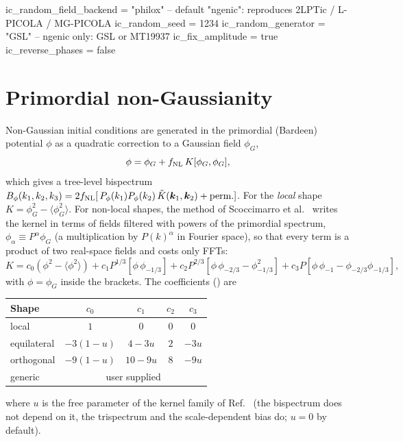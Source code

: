 \begin{paramfile}[SimulationCode]
ic_random_field_backend = "philox"   -- default "ngenic": reproduces 2LPTic / L-PICOLA / MG-PICOLA
ic_random_seed          = 1234
ic_random_generator     = "GSL"      -- ngenic only: GSL or MT19937
ic_fix_amplitude        = true
ic_reverse_phases       = false
\end{paramfile}

\section{Primordial non-Gaussianity}\label{sec:rf-fnl}

Non-Gaussian initial conditions are generated in the primordial (Bardeen) potential $\phi$ as a quadratic
correction to a Gaussian field $\phi_G$,
\begin{equation}
\phi=\phi_G+f_{\rm NL}\,K[\phi_G,\phi_G],
\end{equation}
which gives a tree-level bispectrum $B_\phi(k_1,k_2,k_3)=2f_{\rm NL}[\,P_\phi(k_1)P_\phi(k_2)\,
\tilde K(\bm{k}_1,\bm{k}_2)+\text{perm.}]$. For the \emph{local} shape $K=\phi_G^2-\langle\phi_G^2\rangle$. For non-local
shapes, the method of Scoccimarro et al.\ \cite{Scoccimarro2012} writes the kernel in terms of fields filtered with
powers of the primordial spectrum, $\phi_\alpha\equiv P^{\alpha}\phi_G$ (a multiplication by $P(k)^\alpha$ in Fourier
space), so that every term is a product of two real-space fields and costs only FFTs:
\begin{equation}
K=c_0\left(\phi^2-\langle\phi^2\rangle\right)+c_1P^{1/3}\!\left[\phi\,\phi_{-1/3}\right]
+c_2P^{2/3}\!\left[\phi\,\phi_{-2/3}-\phi_{-1/3}^2\right]+c_3P\!\left[\phi\,\phi_{-1}-\phi_{-2/3}\phi_{-1/3}\right],
\label{eq:rf-kernel}
\end{equation}
with $\phi=\phi_G$ inside the brackets. The coefficients () are
\begin{center}\small
\begin{tabular}{@{}lcccc@{}}
\toprule
Shape & $c_0$ & $c_1$ & $c_2$ & $c_3$ \\
\midrule
local & $1$ & $0$ & $0$ & $0$ \\
equilateral & $-3(1-u)$ & $4-3u$ & $2$ & $-3u$ \\
orthogonal & $-9(1-u)$ & $10-9u$ & $8$ & $-9u$ \\
generic & \multicolumn{4}{c}{user supplied} \\
\bottomrule
\end{tabular}
\end{center}
where $u$ is the free parameter of the kernel family of Ref.~\cite{Scoccimarro2012} (the bispectrum does not depend on
it, the trispectrum and the scale-dependent bias do; $u=0$ by default).

